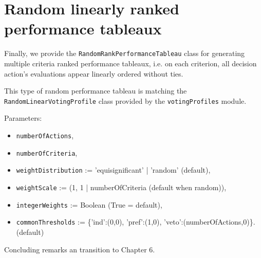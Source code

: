 \section{Random linearly ranked performance tableaux}
\label{sec:6.6}

Finally, we provide the \texttt{RandomRankPerformanceTableau} class for generating multiple criteria ranked performance tableaux, i.e. on each criterion, all decision action's evaluations appear linearly ordered without ties.

This type of random performance tableau is matching the \texttt{RandomLinearVotingProfile} class provided by the \texttt{votingProfiles} module.  
        
Parameters:
\begin{itemize}
\item \texttt{numberOfActions},
\item \texttt{numberOfCriteria},
\item \texttt{weightDistribution} := 'equisignificant' | 'random' (default),
\item \texttt{weightScale} := (1, 1 | numberOfCriteria (default when random)),
\item \texttt{integerWeights} := Boolean (True = default),
\item \texttt{commonThresholds} := \{'ind':(0,0), 'pref':(1,0), 'veto':(numberOfActions,0)\}. (default) 
\end{itemize}


Concluding remarks an transition to Chapter 6. 